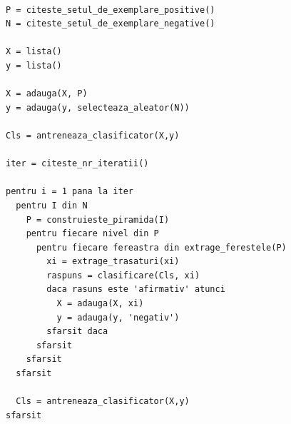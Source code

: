 \begin{mdframed}
\begin{verbatim}

P = citeste_setul_de_exemplare_positive()
N = citeste_setul_de_exemplare_negative()

X = lista()
y = lista()

X = adauga(X, P)
y = adauga(y, selecteaza_aleator(N))

Cls = antreneaza_clasificator(X,y)

iter = citeste_nr_iteratii()

pentru i = 1 pana la iter
  pentru I din N
    P = construieste_piramida(I)
    pentru fiecare nivel din P
      pentru fiecare fereastra din extrage_ferestele(P)
        xi = extrage_trasaturi(xi)
        raspuns = clasificare(Cls, xi)
        daca rasuns este 'afirmativ' atunci
          X = adauga(X, xi)
          y = adauga(y, 'negativ')
        sfarsit daca
      sfarsit
    sfarsit
  sfarsit
  
  Cls = antreneaza_clasificator(X,y)
sfarsit

\end{verbatim}
\end{mdframed}



















